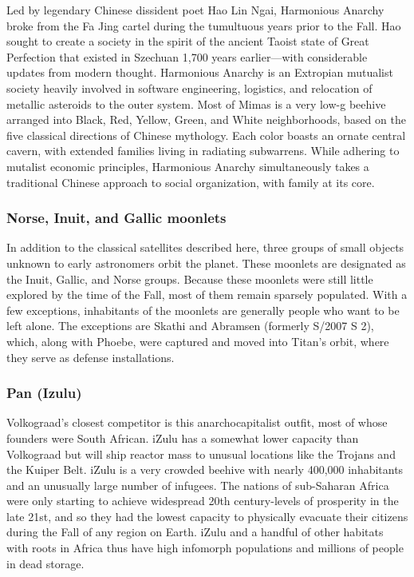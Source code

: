 Led by legendary Chinese dissident poet Hao Lin Ngai, Harmonious Anarchy broke from the Fa Jing cartel during the tumultuous years prior to the Fall. Hao sought to create a society in the spirit of the ancient Taoist state of Great Perfection that existed in Szechuan 1,700 years earlier—with considerable updates from modern thought. Harmonious Anarchy is an Extropian mutualist society heavily involved in software engineering, logistics, and relocation of metallic asteroids to the outer system. Most of Mimas is a very low-g beehive arranged into Black, Red, Yellow, Green, and White neighborhoods, based on the five classical directions of Chinese mythology. Each color boasts an ornate central cavern, with extended families living in radiating subwarrens. While adhering to mutalist economic principles, Harmonious Anarchy simultaneously takes a traditional Chinese approach to social organization, with family at its core. 

\subsubsection{Norse, Inuit, and Gallic moonlets}
\label{sec:norse-inuit-gallic} 

In addition to the classical satellites described here, three groups of small objects unknown to early astronomers orbit the planet. These moonlets are designated as the Inuit, Gallic, and Norse groups. Because these moonlets were still little explored by the time of the Fall, most of them remain sparsely populated. With a few exceptions, inhabitants of the moonlets are generally people who want to be left alone. The exceptions are Skathi and Abramsen (formerly S/2007 S 2), which, along with Phoebe, were captured and moved into Titan's orbit, where they serve as defense installations. 

\subsubsection{Pan (Izulu)}
\label{sec:pan-izulu} 

Volkograad's closest competitor is this anarchocapitalist outfit, most of whose founders were South African. iZulu has a somewhat lower capacity than Volkograad but will ship reactor mass to unusual locations like the Trojans and the Kuiper Belt. iZulu is a very crowded beehive with nearly 400,000 inhabitants and an unusually large number of infugees. The nations of sub-Saharan Africa were only starting to achieve widespread 20th century-levels of prosperity in the late 21st, and so they had the lowest capacity to physically evacuate their citizens during the Fall of any region on Earth. iZulu and a handful of other habitats with roots in Africa thus have high infomorph populations and millions of people in dead storage. 

